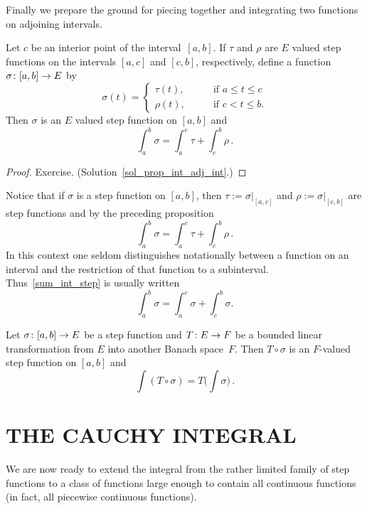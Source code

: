 Finally we prepare the ground for piecing together and integrating two functions on adjoining
intervals.

\begin{prop}\label{prop_int_adj_int} Let $c$ be an interior point of the interval~$[a,b]$.  If
$\tau$ and $\rho$ are $E$ valued step functions on the intervals $[a,c]$ and $[c,b]$,
respectively, define a function $\sigma\colon [a,b] \rightarrow E$ by
  \[ \sigma(t) =
        \begin{cases}
             \tau(t),  \qquad &\text{if $a \le t \le c$} \\
             \rho(t),  \qquad &\text{if $c < t \le b$}.
        \end{cases}\]
Then $\sigma$ is an $E$ valued step function on $[a,b]$ and
  \[ \int_a^b\sigma = \int_a^c\tau + \int_c^b\rho\,. \]
\end{prop}

\begin{proof} Exercise.  (Solution~\ref{sol_prop_int_adj_int}.)
 \ns  \end{proof}

Notice that if $\sigma$ is a step function on $[a,b]$, then $\tau := \sigma|_{[a,c]}$ and
$\rho := \sigma|_{[c,b]}$ are step functions and by the preceding proposition
  \[ \label{sum_int_step} \int_a^b\sigma = \int_a^c\tau + \int_c^b\rho\,. \]
In this context one seldom distinguishes notationally between a function on an interval and
the restriction of that function to a subinterval.  Thus~\eqref{sum_int_step} is usually
written
  \[ \int_a^b\sigma = \int_a^c\sigma + \int_c^b\sigma. \]


\begin{prob}\label{prob_int_compop}  Let $\sigma\colon [a,b] \rightarrow E$ be a step function and
$T\colon E \rightarrow F$ be a bounded linear transformation from $E$ into another Banach space~$F$.
Then $T \circ \sigma$ is an $F$-valued step function on $[a,b]$ and
  \[ \int(T\circ \sigma) =  T\bigl(\int\sigma\bigr)\,. \]
\end{prob}













\section{THE CAUCHY INTEGRAL}\label{Cauchy_int}   We are now ready to extend the integral from
the rather limited family of step functions to a class of functions large enough to contain
all continuous functions (in fact, all piecewise continuous functions).

